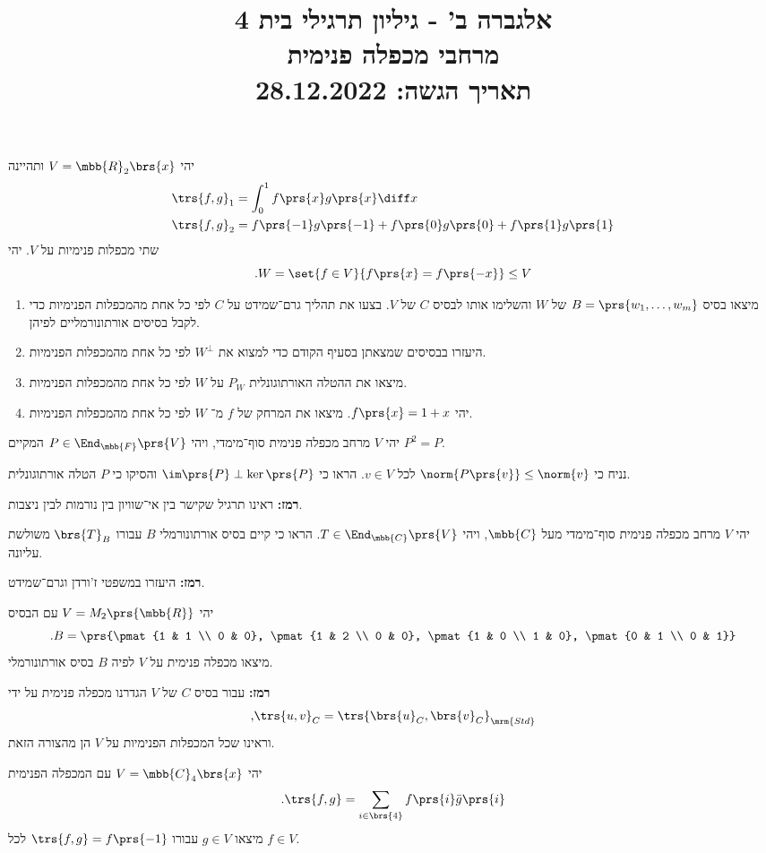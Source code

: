 \documentclass[a4paper,10pt,twoside,openany]{article}
\title{
אלגברה ב' - גיליון תרגילי בית 4 \\
מרחבי מכפלה פנימית
\\
\vspace{1cm}
\large{תאריך הגשה: 28.12.2022}
}
\date{}
\begin{document}
\maketitle

\begin{exercise}%
יהי
$V = \mbb{R}_2\brs{x}$
ותהיינה
\begin{align*}
\trs{f,g}_1 &= \int_0^1 f\prs{x} g\prs{x} \diff x \\
\trs{f,g}_2 &= f\prs{-1} g\prs{-1} + f\prs{0} g\prs{0} + f\prs{1} g\prs{1}
\end{align*}
שתי מכפלות פנימיות על
$V$.
יהי
\[\text{.} W = \set{f \in V}{f\prs{x} = f\prs{-x}} \leq V\]
\begin{enumerate}
\item 
מיצאו בסיס
$B = \prs{w_1, \ldots, w_m}$
של
$W$
והשלימו אותו לבסיס
$C$
של
$V$.
בצעו את תהליך גרם־שמידט על
$C$
לפי כל אחת מהמכפלות הפנימיות כדי לקבל בסיסים אורתונורמליים לפיהן.

\item
היעזרו בבסיסים שמצאתן בסעיף הקודם כדי למצוא
את
$W^\perp$
לפי כל אחת מהמכפלות הפנימיות.

\item
מיצאו את ההטלה האורתוגונלית
$P_W$
על
$W$
לפי כל אחת מהמכפלות הפנימיות.

\item
יהי
$f\prs{x} = 1 + x$.
מיצאו את המרחק של
$f$
מ־%
$W$
לפי כל אחת מהמכפלות הפנימיות.
\end{enumerate}
\end{exercise}

\begin{exercise}%
יהי
$V$
מרחב מכפלה פנימית סוף־מימדי, ויהי
$P \in \End_{\mbb{F}}\prs{V}$
המקיים
$P^2 = P$.

נניח כי
$\norm{P\prs{v}} \leq \norm{v}$
לכל
$v \in V$.
הראו כי
$\im\prs{P} \perp \ker\prs{P}$
והסיקו כי
$P$
הטלה אורתוגונלית.

\textbf{רמז:}
ראינו תרגיל שקישר בין אי־שוויון בין נורמות לבין ניצבות.
\end{exercise}

\begin{exercise}%
יהי
$V$
מרחב מכפלה פנימית סוף־מימדי מעל
$\mbb{C}$,
ויהי
$T \in \End_{\mbb{C}}\prs{V}$.
הראו כי קיים בסיס אורתונורמלי
$B$
עבורו
$\brs{T}_B$
משולשת עליונה.

\textbf{רמז:}
היעזרו במשפטי ז'ורדן וגרם־שמידט.
\end{exercise}

\begin{exercise}%
יהי
$V = M_2\prs{\mbb{R}}$
עם הבסיס
\[\text{.} B = \prs{\pmat{1 & 1 \\ 0 & 0}, \pmat{1 & 2 \\ 0 & 0}, \pmat{1 & 0 \\ 1 & 0}, \pmat{0 & 1 \\ 0 & 1}}\]
מיצאו מכפלה פנימית על
$V$
לפיה
$B$
בסיס אורתונורמלי.

\textbf{רמז:}
עבור בסיס
$C$
של
$V$
הגדרנו מכפלה פנימית על ידי
\[\text{,} \trs{u,v}_C = \trs{\brs{u}_C, \brs{v}_C}_{\mrm{Std}}\]
וראינו שכל המכפלות הפנימיות על
$V$
הן מהצורה הזאת.
\end{exercise}

\begin{exercise}%
יהי
$V = \mbb{C}_4\brs{x}$
עם המכפלה הפנימית
\[\text{.} \trs{f,g} = \sum_{i \in \brs{4}} f\prs{i} \bar{g}\prs{i}\]
מיצאו
$g \in V$
עבורו
$\trs{f,g} = f\prs{-1}$
לכל
$f \in V$.
\end{exercise}
\end{document}
